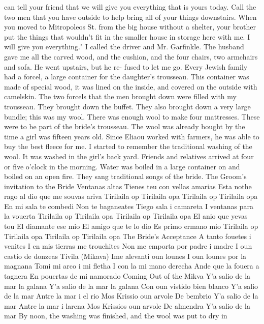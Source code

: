 can tell your friend that we will give you everything that is yours today.
Call the 
two men that you have outside to help bring all of your things downstairs.
When 
you moved to Mitropoleos St.
from the big house without a shelter, your brother put the 
things that wouldn't fit in the smaller house in storage here with me.
I will give you 
everything."
I called the driver and Mr.
Garfinkle.
The husband gave me all the carved wood, and 
the cushion, and the four chairs, two armchairs and sofa.
He went upstairs, but he re-
fused to let me go.
Every Jewish family had a forcel, a large container for the daughter's trousseau.
This container was made of special wood, it was lined on the inside, 
and covered on the outside with camelskin.
The two forcels that the men brought down 
were filled with my trousseau.
They brought down the buffet.
They also brought down a 
very large bundle; this was my wool.
There was enough wool to make four mattresses.
These were to be 
part of the bride's trousseau.
The wool was already bought by the time 
a girl was fifteen years old.
Since Eliaou worked with farmers, he was 
able to buy the best fleece for me.
I started to remember the traditional washing of the wool.
It was washed in the girl's back yard.
Friends and relatives arrived at four or five o’clock in the morning.
Water was boiled in a large container on 
and boiled on an open fire.
They sang traditional songs of the bride.
The Groom’s invitation to the Bride 
Ventanas altas 
Tienes teu con vellas amarias 
Esta nothe rago al dio 
que me souvas ariva 
Tirilaila op Tirilaila opa 
Tirilaila op Tirilaila opa 
En mi sala te combedi 
Non te baganeates 
Tiego sala i camareta 
I ventanas para la vouerta 
Tirilaila op Tirilaila opa 
Tirilaila op Tirilaila opa 
El anio que yevas tou 
El diamante ese mio 
El amigo que te lo dio 
Es primo ermano mio 
Tirilaila op Tirilaila opa 
Tirilaila op Tirilaila opa 
The Bride's Acceptance 
A tanto fouetes i venites 
I en mis tierras me trouchites 
Non me emporta por padre i madre 
I oun castio de donzeas 
Tivila (Mikava) 
Ime alevanti oun lounes 
I oun lounes por la magnana 
Tomi mi arco i mi fletha 
I con la mi mano derecha 
Ande que la fouera a tagnera 
En pouertas de mi namorado 
Coming Out of the Mikva 
Y'a salio de la mar la galana 
Y'a salio de la mar la galana 
Con oun vistido bien blanco 
Y'a salio de la mar 
Antre la mar i el rio 
Mos Krissio oun arvole 
De bembrio 
Y'a salio de la mar 
Antre la mar i larena 
Mos Krissios oun arvole 
De almendra 
Y'a salio de la mar 
By noon, the washing was finished, and the wool was put to dry in 
